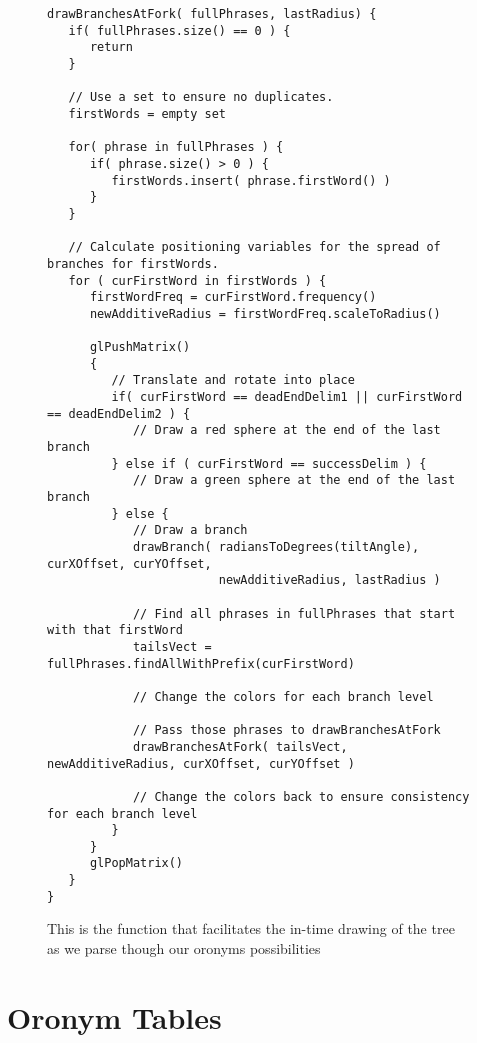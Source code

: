 \begin{figure}
\begin{adjustwidth}{-1in}{}
\begin{verbatim}
drawBranchesAtFork( fullPhrases, lastRadius) {
   if( fullPhrases.size() == 0 ) {
      return
   }
   
   // Use a set to ensure no duplicates.
   firstWords = empty set
   
   for( phrase in fullPhrases ) {
      if( phrase.size() > 0 ) {
         firstWords.insert( phrase.firstWord() )
      }
   }
   
   // Calculate positioning variables for the spread of branches for firstWords.
   for ( curFirstWord in firstWords ) {
      firstWordFreq = curFirstWord.frequency()
      newAdditiveRadius = firstWordFreq.scaleToRadius()

      glPushMatrix()
      {
         // Translate and rotate into place
         if( curFirstWord == deadEndDelim1 || curFirstWord == deadEndDelim2 ) {
            // Draw a red sphere at the end of the last branch
         } else if ( curFirstWord == successDelim ) {
            // Draw a green sphere at the end of the last branch
         } else {
            // Draw a branch
            drawBranch( radiansToDegrees(tiltAngle), curXOffset, curYOffset,
                        newAdditiveRadius, lastRadius )
            
            // Find all phrases in fullPhrases that start with that firstWord
            tailsVect = fullPhrases.findAllWithPrefix(curFirstWord)
            
            // Change the colors for each branch level

            // Pass those phrases to drawBranchesAtFork
            drawBranchesAtFork( tailsVect, newAdditiveRadius, curXOffset, curYOffset )
            
            // Change the colors back to ensure consistency for each branch level
         }
      }
      glPopMatrix()
   }
}
\end{verbatim}
\end{adjustwidth}
\captionfonts
\caption[Code for drawBranchesAtFork]{ This is the function that facilitates the in-time drawing of the tree as we parse though our oronyms possibilities }
\label{fig:psuedoCode:drawBranchesAtFork}
\end{figure}


\chapter{Oronym Tables}
\label{appendix:table:oronymTable}

